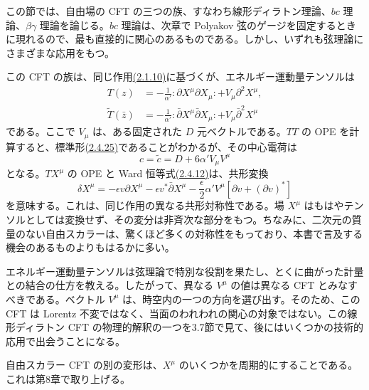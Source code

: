 この節では、自由場の CFT の三つの族、すなわち線形ディラトン理論、$bc$ 理論、$\beta\gamma$ 理論を論じる。$bc$ 理論は、次章で Polyakov 弦のゲージを固定するときに現れるので、最も直接的に関心のあるものである。しかし、いずれも弦理論にさまざまな応用をもつ。


この CFT の族は、同じ作用\hyperref[eq:2.1.10]{(2.1.10)}に基づくが、エネルギー運動量テンソルは
\begin{align}
T(z)&=-\frac1{\alpha'}:\partial X^\mu\partial X_\mu:
+V_\mu\partial^2X^\mu,
\tag{2.5.1a}\label{eq:2.5.1a}\\
\widetilde T(\bar z)&=-\frac1{\alpha'}:\bar\partial X^\mu\bar\partial X_\mu:
+V_\mu\bar\partial^2X^\mu
\tag{2.5.1b}\label{eq:2.5.1b}
\end{align}
である。ここで $V_\mu$ は、ある固定された $D$ 元ベクトルである。$TT$ の OPE を計算すると、標準形\hyperref[eq:2.4.25]{(2.4.25)}であることがわかるが、その中心電荷は
\begin{equation}
c=\tilde c=D+6\alpha' V_\mu V^\mu
\tag{2.5.2}\label{eq:2.5.2}
\end{equation}
となる。$TX^\mu$ の OPE と Ward 恒等式\hyperref[eq:2.4.12]{(2.4.12)}は、共形変換
\begin{equation}
\delta X^\mu=-\epsilon v\partial X^\mu
-\epsilon v^*\bar\partial X^\mu
-\frac\epsilon2\alpha' V^\mu\left[\partial v+(\partial v)^*\right]
\tag{2.5.3}\label{eq:2.5.3}
\end{equation}
を意味する。これは、同じ作用の異なる共形対称性である。場 $X^\mu$ はもはやテンソルとしては変換せず、その変分は非斉次な部分をもつ。ちなみに、二次元の質量のない自由スカラーは、驚くほど多くの対称性をもっており、本書で言及する機会のあるものよりもはるかに多い。

エネルギー運動量テンソルは弦理論で特別な役割を果たし、とくに曲がった計量との結合の仕方を教える。したがって、異なる $V^\mu$ の値は異なる CFT とみなすべきである。ベクトル $V^\mu$ は、時空内の一つの方向を選び出す。そのため、この CFT は Lorentz 不変ではなく、当面のわれわれの関心の対象ではない。この線形ディラトン CFT の物理的解釈の一つを3.7節で見て、後にはいくつかの技術的応用で出会うことになる。

自由スカラー CFT の別の変形は、$X^\mu$ のいくつかを周期的にすることである。これは第8章で取り上げる。


